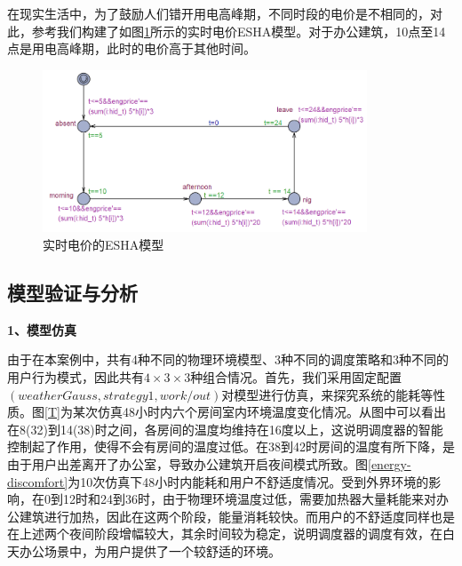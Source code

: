 	在现实生活中，为了鼓励人们错开用电高峰期，不同时段的电价是不相同的，对此，参考\citep{刘经浩2015一种基于实时电价的}我们构建了如图\ref{price}所示的实时电价ESHA模型。对于办公建筑，10点至14点是用电高峰期，此时的电价高于其他时间。
	
	\begin{figure}[!t]
	\centering
	\includegraphics[width=3.8in]{price.png}
	\caption{实时电价的ESHA模型}
	\label{price}
	\end{figure}
	
\subsection{模型验证与分析}
\textbf{1、模型仿真}

	由于在本案例中，共有4种不同的物理环境模型、3种不同的调度策略和3种不同的用户行为模式，因此共有$4\times3\times3$种组合情况。首先，我们采用固定配置$(weatherGauss,strategy1,work/out)$对模型进行仿真，来探究系统的能耗等性质。图\ref{T}为某次仿真48小时内六个房间室内环境温度变化情况。从图中可以看出在8(32)到14(38)时之间，各房间的温度均维持在16度以上，这说明调度器的智能控制起了作用，使得不会有房间的温度过低。在38到42时房间的温度有所下降，是由于用户出差离开了办公室，导致办公建筑开启夜间模式所致。图\ref{energy-discomfort}为10次仿真下48小时内能耗和用户不舒适度情况。受到外界环境的影响，在0到12时和24到36时，由于物理环境温度过低，需要加热器大量耗能来对办公建筑进行加热，因此在这两个阶段，能量消耗较快。而用户的不舒适度同样也是在上述两个夜间阶段增幅较大，其余时间较为稳定，说明调度器的调度有效，在白天办公场景中，为用户提供了一个较舒适的环境。
	
